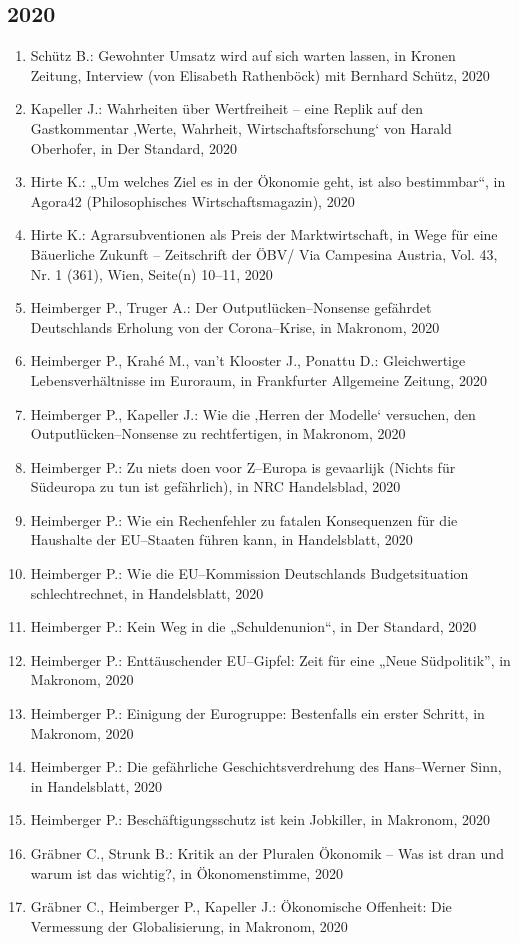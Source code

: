 \subsection*{2020}
\begin{enumerate}
    	 \item Schütz B.: Gewohnter Umsatz wird auf sich warten lassen, in Kronen Zeitung, Interview (von Elisabeth Rathenböck) mit Bernhard Schütz, 2020
	 \item Kapeller J.: Wahrheiten über Wertfreiheit – eine Replik auf den Gastkommentar ‚Werte, Wahrheit, Wirtschaftsforschung‘ von Harald Oberhofer, in Der Standard, 2020
	 \item Hirte K.: „Um welches Ziel es in der Ökonomie geht, ist also bestimmbar“, in Agora42 (Philosophisches Wirtschaftsmagazin), 2020
	 \item Hirte K.: Agrarsubventionen als Preis der Marktwirtschaft, in Wege für eine Bäuerliche Zukunft – Zeitschrift der ÖBV/ Via Campesina Austria, Vol. 43, Nr. 1 (361), Wien, Seite(n) 10--11, 2020
	 \item Heimberger P., Truger A.: Der Outputlücken--Nonsense gefährdet Deutschlands Erholung von der Corona--Krise, in Makronom, 2020
	 \item Heimberger P., Krahé M., van't Klooster J., Ponattu D.: Gleichwertige Lebensverhältnisse im Euroraum, in Frankfurter Allgemeine Zeitung, 2020
	 \item Heimberger P., Kapeller J.: Wie die ‚Herren der Modelle‘ versuchen, den Outputlücken--Nonsense zu rechtfertigen, in Makronom, 2020
	 \item Heimberger P.: Zu niets doen voor Z--Europa is gevaarlijk (Nichts für Südeuropa zu tun ist gefährlich), in NRC Handelsblad, 2020
	 \item Heimberger P.: Wie ein Rechenfehler zu fatalen Konsequenzen für die Haushalte der EU--Staaten führen kann, in Handelsblatt, 2020
	 \item Heimberger P.: Wie die EU--Kommission Deutschlands Budgetsituation schlechtrechnet, in Handelsblatt, 2020
	 \item Heimberger P.: Kein Weg in die „Schuldenunion“, in Der Standard, 2020
	 \item Heimberger P.: Enttäuschender EU--Gipfel: Zeit für eine „Neue Südpolitik”, in Makronom, 2020
	 \item Heimberger P.: Einigung der Eurogruppe: Bestenfalls ein erster Schritt, in Makronom, 2020
	 \item Heimberger P.: Die gefährliche Geschichtsverdrehung des Hans--Werner Sinn, in Handelsblatt, 2020
	 \item Heimberger P.: Beschäftigungsschutz ist kein Jobkiller, in Makronom, 2020
	 \item Gräbner C., Strunk B.: Kritik an der Pluralen Ökonomik – Was ist dran und warum ist das wichtig?, in Ökonomenstimme, 2020
	 \item Gräbner C., Heimberger P., Kapeller J.: Ökonomische Offenheit: Die Vermessung der Globalisierung, in Makronom, 2020
\end{enumerate}
